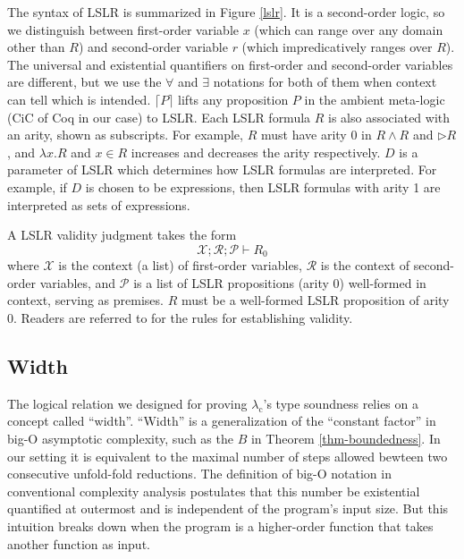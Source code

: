 \documentclass[preprint]{sigplanconf}
\newcommand{\later}{\triangleright}
\newcommand{\logo}{\lambda_\mathrm{c}}
\begin{document}
The syntax of LSLR is summarized in Figure \ref{lslr}. It is a second-order logic, so we distinguish between first-order variable $x$ (which can range over any domain other than $R$) and second-order variable $r$ (which impredicatively ranges over $R$). The universal and existential quantifiers on first-order and second-order variables are different, but we use the $\forall$ and $\exists$ notations for both of them when context can tell which is intended. $\lceil P \rceil$ lifts any proposition $P$ in the ambient meta-logic (CiC of Coq in our case) to LSLR. Each LSLR formula $R$ is also associated with an arity, shown as subscripts. For example, $R$ must have arity 0 in $R \wedge R$ and $\later R$, and $\lambda x.R$ and $x\in R$ increases and decreases the arity respectively. $D$ is a parameter of LSLR which determines how LSLR formulas are interpreted. For example, if $D$ is chosen to be expressions, then LSLR formulas with arity 1 are interpreted as sets of expressions. 

A LSLR validity judgment takes the form
$$\mathcal{X};\mathcal{R};\mathcal{P}\vdash R_0$$
where $\mathcal{X}$ is the context (a list) of first-order variables, $\mathcal{R}$ is the context of second-order variables, and $\mathcal{P}$ is a list of LSLR propositions (arity 0) well-formed in context, serving as premises. $R$ must be a well-formed LSLR proposition of arity 0. Readers are referred to \cite{dreyer2009logical} for the rules for establishing validity.

\subsection {Width}

The logical relation we designed for proving $\logo$'s type soundness relies on a concept called ``width''. ``Width'' is a generalization of the ``constant factor'' in big-O asymptotic complexity, such as the $B$ in Theorem \ref{thm-boundedness}. In our setting it is equivalent to the maximal number of steps allowed bewteen two consecutive unfold-fold reductions. The definition of big-O notation in conventional complexity analysis postulates that this number be existential quantified at outermost and is independent of the program's input size. But this intuition breaks down when the program is a higher-order function that takes another function as input. 
\end{document}
